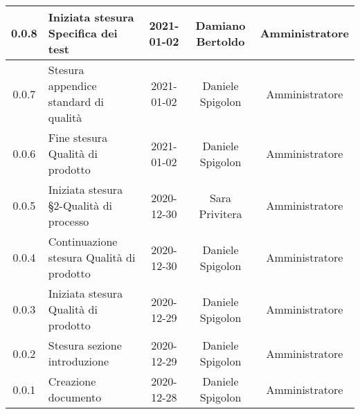\begin{center}
\begin{longtable}{|c|p{5cm}|c|c|c|}
	\hline
	0.0.8 & Iniziata stesura Specifica dei test & 2021-01-02 & Damiano Bertoldo & Amministratore \\
	\hline
	0.0.7 & Stesura appendice standard di qualità & 2021-01-02 & Daniele Spigolon & Amministratore \\
	\hline
	0.0.6 & Fine stesura Qualità di prodotto & 2021-01-02 & Daniele Spigolon & Amministratore \\
	\hline
	0.0.5 & Iniziata stesura §2-Qualità di processo & 2020-12-30 & Sara Privitera & Amministratore \\
	\hline
	0.0.4 & Continuazione stesura Qualità di prodotto & 2020-12-30 & Daniele Spigolon & Amministratore \\
	\hline
	0.0.3 & Iniziata stesura Qualità di prodotto & 2020-12-29 & Daniele Spigolon & Amministratore \\
	\hline
	0.0.2 & Stesura sezione introduzione & 2020-12-29 & Daniele Spigolon & Amministratore \\
	\hline
	0.0.1 & Creazione documento & 2020-12-28 & Daniele Spigolon & Amministratore \\
	\hline

	\end{longtable}
\end{center}
